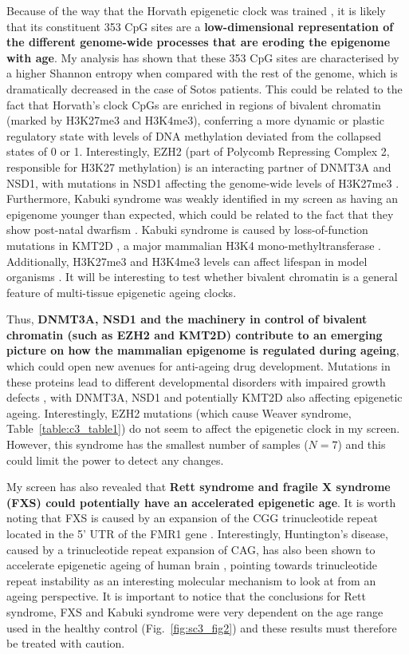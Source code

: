 Because of the way that the Horvath epigenetic clock was trained \cite{Horvath2013}, it is likely that its constituent 353 CpG sites are a \textbf{low-dimensional representation of the different genome-wide processes that are eroding the epigenome with age}. My analysis has shown that these 353 CpG sites are characterised by a higher Shannon entropy when compared with the rest of the genome, which is dramatically decreased in the case of Sotos patients. This could be related to the fact that Horvath's clock CpGs are enriched in regions of bivalent chromatin (marked by H3K27me3 and H3K4me3), conferring a more dynamic or plastic regulatory state with levels of DNA methylation deviated from the collapsed states of 0 or 1. Interestingly, EZH2 (part of Polycomb Repressing Complex 2, responsible for H3K27 methylation) is an interacting partner of DNMT3A and NSD1, with mutations in NSD1 affecting the genome-wide levels of H3K27me3 \cite{Streubel2018}. Furthermore, Kabuki syndrome was weakly identified in my screen as having an epigenome younger than expected, which could be related to the fact that they show post-natal dwarfism \cite{Aref-Eshghi2017,Butcher2017}. Kabuki syndrome is caused by loss-of-function mutations in KMT2D \cite{Aref-Eshghi2017,Butcher2017}, a major mammalian H3K4 mono-methyltransferase \cite{Froimchuk2017}. Additionally, H3K27me3 and H3K4me3 levels can affect lifespan in model organisms \cite{Sen2016}. It will be interesting to test whether bivalent chromatin is a general feature of multi-tissue epigenetic ageing clocks.

\bigskip

Thus, \textbf{DNMT3A, NSD1 and the machinery in control of bivalent chromatin (such as EZH2 and KMT2D) contribute to an emerging picture on how the mammalian epigenome is regulated during ageing}, which could open new avenues for anti-ageing drug development. Mutations in these proteins lead to different developmental disorders with impaired growth defects \cite{Bjornsson2015}, with DNMT3A, NSD1 and potentially KMT2D also affecting epigenetic ageing. Interestingly, EZH2 mutations (which cause Weaver syndrome, Table~\ref{table:c3_table1}) do not seem to affect the epigenetic clock in my screen. However, this syndrome has the smallest number of samples ($N=7$) and this could limit the power to detect any changes.

\bigskip

My screen has also revealed that \textbf{Rett syndrome and fragile X syndrome (\acrshort{FXS}) could potentially have an accelerated epigenetic age}. It is worth noting that FXS is caused by an expansion of the CGG trinucleotide repeat located in the 5' \acrshort{UTR} of the FMR1 gene \cite{Schenkel2016}. Interestingly, Huntington's disease, caused by a trinucleotide repeat expansion of CAG, has also been shown to accelerate epigenetic ageing of human brain \cite{Horvath2016a}, pointing towards trinucleotide repeat instability as an interesting molecular mechanism to look at from an ageing perspective. It is important to notice that the conclusions for Rett syndrome, FXS and Kabuki syndrome were very dependent on the age range used in the healthy control (Fig.~\ref{fig:sc3_fig2}) and these results must therefore be treated with caution.

